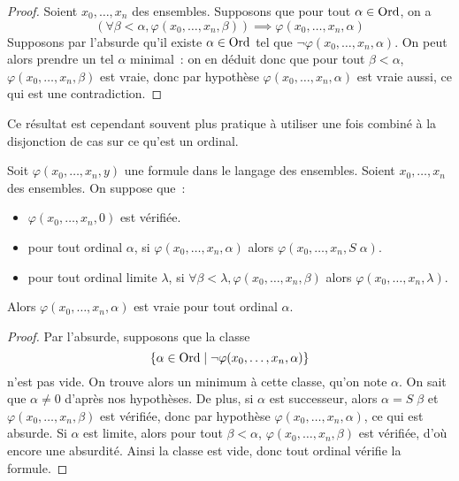\begin{proof}
  Soient $x_0,\ldots,x_n$ des ensembles. Supposons que pour tout
  $\alpha\in\operatorname{Ord}$, on a
  \[(\forall \beta < \alpha, \varphi(x_0,\ldots,x_n,\beta))\implies
  \varphi(x_0,\ldots,x_n,\alpha)\]
  Supposons par l'absurde qu'il existe $\alpha \in \operatorname{Ord}$ tel que
  $\lnot\varphi(x_0,\ldots,x_n,\alpha)$. On peut alors prendre un tel $\alpha$
  minimal~: on en déduit donc que pour tout $\beta < \alpha$,
  $\varphi(x_0,\ldots,x_n,\beta)$ est vraie, donc par hypothèse
  $\varphi(x_0,\ldots,x_n,\alpha)$ est vraie aussi, ce qui est une
  contradiction.
\end{proof}

Ce résultat est cependant souvent plus pratique à utiliser une fois combiné à la
disjonction de cas sur ce qu'est un ordinal.

\begin{proposition}
  Soit $\varphi(x_0,\ldots,x_n,y)$ une formule dans le langage des ensembles.
  Soient $x_0,\ldots,x_n$ des ensembles. On suppose que~:
  \begin{itemize}
  \item $\varphi(x_0,\ldots,x_n,0)$ est vérifiée.
  \item pour tout ordinal $\alpha$, si $\varphi(x_0,\ldots,x_n,\alpha)$ alors
    $\varphi(x_0,\ldots,x_n,S\;\alpha)$.
  \item pour tout ordinal limite $\lambda$, si
    $\forall \beta < \lambda, \varphi(x_0,\ldots,x_n,\beta)$ alors
    $\varphi(x_0,\ldots,x_n,\lambda)$.
  \end{itemize}

  Alors $\varphi(x_0,\ldots,x_n,\alpha)$ est vraie pour tout ordinal $\alpha$.
\end{proposition}

\begin{proof}
  Par l'absurde, supposons que la classe
  \[\{\alpha \in\operatorname{Ord}\mid \mathcal \lnot\varphi(x_0,\ldots,x_n,\alpha)\}\]
  n'est pas vide. On trouve alors un minimum à cette classe, qu'on note
  $\alpha$. On sait que $\alpha \neq 0$ d'après nos hypothèses. De plus, si
  $\alpha$ est successeur, alors $\alpha = S\;\beta$ et
  $\varphi(x_0,\ldots,x_n,\beta)$ est vérifiée, donc par hypothèse
  $\varphi(x_0,\ldots,x_n,\alpha)$, ce qui est absurde. Si $\alpha$ est limite,
  alors pour tout $\beta < \alpha$, $\varphi(x_0,\ldots,x_n,\beta)$ est
  vérifiée, d'où encore une absurdité.
  Ainsi la classe est vide, donc tout ordinal vérifie la formule.
\end{proof}

